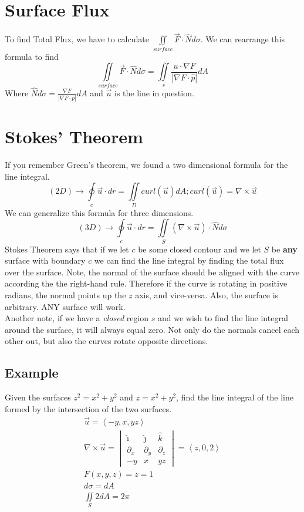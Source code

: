 \documentclass{article}
\newcommand{\nvec}[1]{\left\langle #1 \right\rangle}
\newcommand{\abs}[1]{\left\lvert #1 \right\rvert}
\begin{document}
\section{Surface Flux}
To find Total Flux, we have to calculate $\iint\limits_{surface} \vec{F} \cdot \hat{N} d \sigma$. We can rearrange this formula to find
\[
\iint\limits_{surface} \vec{F} \cdot \hat{N} d \sigma = \iint\limits_s \frac{u \cdot \nabla F}{\abs{\nabla F \cdot \hat{p}}} dA
\]
Where $\hat{N} d \sigma = \frac{\nabla F}{\abs{\nabla F \cdot \hat{p}}} dA$ and $\vec{u}$ is the line in question.

\section{Stokes' Theorem}
If you remember Green's theorem, we found a two dimensional formula for the line integral.
\[
(2D)\to \oint\limits_c \vec{u} \cdot dr = \iint\limits_D curl(\vec{u}) dA; curl(\vec{u})=\nabla \times \vec{u}
\]
We can generalize this formula for three dimensions.
\[
(3D)\to \oint\limits_c \vec{u} \cdot dr = \iint\limits_S (\nabla \times \vec{u}) \cdot \hat{N} d \sigma
\]
Stokes Theorem says that if we let $c$ be some closed contour and we let $S$ be \textbf{any} surface with boundary $c$ we can find the line integral by finding the total flux over the surface. Note, the normal of the surface should be aligned with the curve according the the right-hand rule. Therefore if the curve is rotating in positive radians, the normal points up the $z$ axis, and vice-versa. Also, the surface is arbitrary. ANY surface will work.\\

Another note, if we have a \textit{closed} region $s$ and we wish to find the line integral around the surface, it will always equal zero. Not only do the normals cancel each other out, but also the curves rotate opposite directions.\\

\subsection{Example}
Given the surfaces $z^2 = x^2 + y^2$ and $z=x^2 + y^2$, find the line integral of the line formed by the intersection of the two surfaces.
\[
\begin{aligned}
\vec{u} = \nvec{-y, x, yz}\\
\nabla \times \vec{u} = 
\begin{vmatrix}
\hat{\imath} & \hat{\jmath} & \hat{k}\\
\partial_x & \partial_y & \partial_z\\
-y & x & yz
\end{vmatrix} = \nvec{z, 0, 2}\\
F(x,y,z) = z = 1\\
d \sigma = dA\\
\iint\limits_S 2 dA = 2 \pi
\end{aligned}
\]
\end{document}

